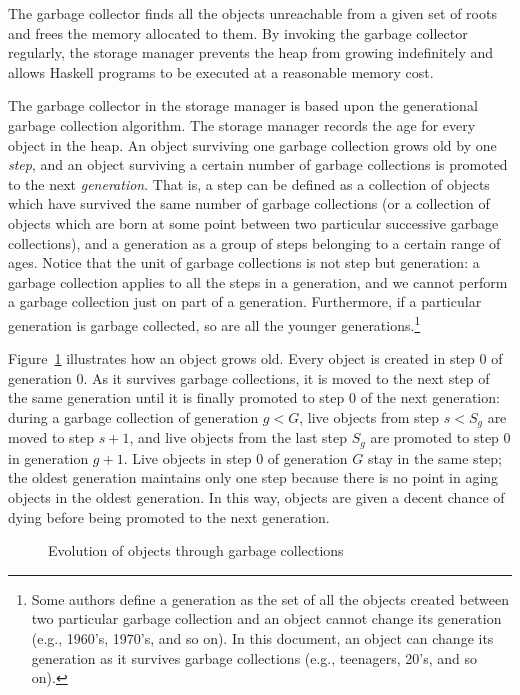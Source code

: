 \documentclass{article}
\begin{document}
The garbage collector finds all the objects unreachable from a given set of
roots and frees the memory allocated to them. By invoking the
garbage collector regularly, the storage manager prevents the heap from
growing indefinitely and allows Haskell programs to be executed at a 
reasonable memory cost.

The garbage collector in the storage manager is based upon the generational 
garbage collection algorithm.
The storage manager records the age for every object in the heap.
An object surviving one garbage collection grows old by one \emph{step},
and an object surviving a certain number of garbage collections 
is promoted to the next \emph{generation}.
That is, a step can be defined as a collection of objects which have survived
the same number of garbage collections (or a collection of objects which are
born at some point between two particular successive garbage collections),
and a generation as a group of steps belonging to a certain range of ages.
Notice that the unit of garbage collections is not step but generation: 
a garbage collection applies to all the steps in a generation, and we cannot 
perform a garbage collection just on part of a generation.
Furthermore, if a particular generation is garbage collected, so are 
all the younger generations.\footnote{Some 
authors define a generation as the set of 
all the objects created between two particular garbage collection and
an object cannot change its generation (e.g., 1960's, 1970's, and so on).
In this document, 
an object can change its generation as it survives garbage collections
(e.g., teenagers, 20's, and so on).}

Figure~\ref{fig-generation} illustrates how an object grows old.
Every object is created in step $0$ of generation $0$. 
As it survives garbage collections, it is moved to the next step of the
same generation until it is finally promoted to 
step $0$ of the next generation:
during a garbage collection of generation $g < G$, live objects from 
step $s < S_g$ are moved to step $s + 1$, and live objects from
the last step $S_g$ are promoted to step $0$ in generation $g + 1$.
Live objects in step $0$ of generation $G$ stay in the same step;
the oldest generation maintains only one step because there is no point
in aging objects in the oldest generation.
In this way, objects are given a decent chance of dying before being
promoted to the next generation.

\begin{figure}[ht]
\begin{center}

\caption{Evolution of objects through garbage collections}
\label{fig-generation}
\end{center}
\end{figure}
\end{document}
